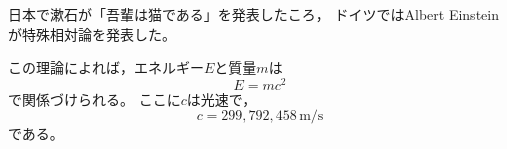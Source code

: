 \documentclass[dvipdfmx]{jsarticle}
\begin{document}
日本で漱石が「吾輩は猫である」を発表したころ，
ドイツではAlbert Einsteinが特殊相対論を発表した。

この理論によれば，エネルギー$E$と質量$m$は
\begin{equation}
  E = mc^{2}
\end{equation}
で関係づけられる。
ここに$c$は光速で，
\begin{equation}
  c = 299{,}792{,}458 \, \mathrm{m/s}
\end{equation}
である。
\end{document}
